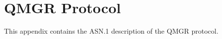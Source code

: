 \chapter {QMGR Protocol}\label{qmgrros}

This appendix contains the ASN.1 description of the QMGR protocol.

